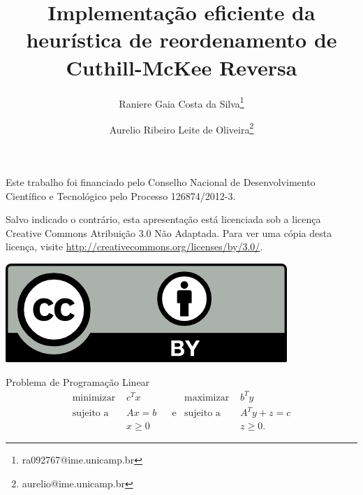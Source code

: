 \documentclass[10pt]{beamer}
\begin{document}
\title[Cuthill-McKee Reversa]{Implementa\c{c}\~{a}o eficiente da heur\'{i}stica de reordenamento de Cuthill-McKee Reversa}
\author[Raniere Silva]{Raniere Gaia Costa da
Silva\footnote{ra092767@ime.unicamp.br}
\and Aurelio Ribeiro Leite de Oliveira\footnote{aurelio@ime.unicamp.br}}
\date{}
\begin{frame}
  \maketitle

  \footnotesize{Este trabalho foi financiado pelo Conselho Nacional de
  Desenvolvimento Cient\'{i}fico e Tecnol\'{o}gico pelo Processo 126874/2012-3.}

  \footnotesize{Salvo indicado o contrário, esta apresentação está licenciada sob a licença
  Creative Commons Atribuição 3.0 Não Adaptada. Para ver uma cópia desta
  licença, visite \url{http://creativecommons.org/licenses/by/3.0/}.}
  \begin{center}
    \includegraphics[scale=.5]{figures/cc-by.png}
  \end{center}
\end{frame}

\begin{frame}{Problema de Programação Linear}
  \begin{align*}
      \text{minimizar } & c^T x
      &&& \text{maximizar } & b^T y \\
      \text{sujeito a } & A x = b
      &&\text{e}& \text{sujeito a } & A^T y + z = c \\
      & x \geq 0
      &&& & z \geq 0.
  \end{align*}
\end{frame}
\end{document}
